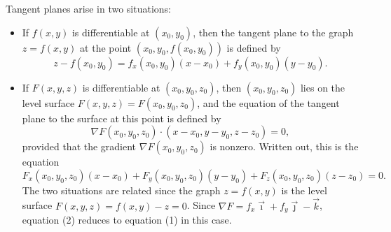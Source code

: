 \begin{facts}
	Tangent planes arise in two situations:
	\begin{itemize}
		\item If $f(x, y)$ is differentiable at $(x_0, y_0)$, then the tangent plane
			to the graph $z = f(x, y)$ at the point $(x_0, y_0, f(x_0, y_0))$ is
			defined by
			\begin{equation}
				z - f(x_0, y_0) = f_x(x_0, y_0) (x - x_0) + f_y(x_0, y_0) (y - y_0).
			\end{equation}
		\item If $F(x, y, z)$ is differentiable at $(x_0, y_0, z_0)$, then $(x_0,
			y_0, z_0)$ lies on the level surface $F(x, y, z) = F(x_0, y_0, z_0)$, and
			the equation of the tangent plane to the surface at this point is defined
			by
			\begin{equation}
				\nabla F(x_0, y_0, z_0) \cdot (x - x_0, y - y_0, z - z_0) = 0,
			\end{equation}
			provided that the gradient $\nabla F(x_0, y_0, z_0)$ is nonzero. Written
			out, this is the equation
			\[
				F_x(x_0, y_0, z_0) (x - x_0) + F_y(x_0, y_0, z_0) (y - y_0) + F_z(x_0,
				y_0, z_0) (z - z_0) = 0.
			\]
			The two situations are related since the graph $z = f(x, y)$ is the level
			surface $F(x, y, z) = f(x, y) - z = 0$. Since $\nabla F = f_x \vec{\imath}
			+ f_y \vec{\jmath} - \vec{k}$, equation (2) reduces to equation (1) in
			this case.
	\end{itemize}
\end{facts}
